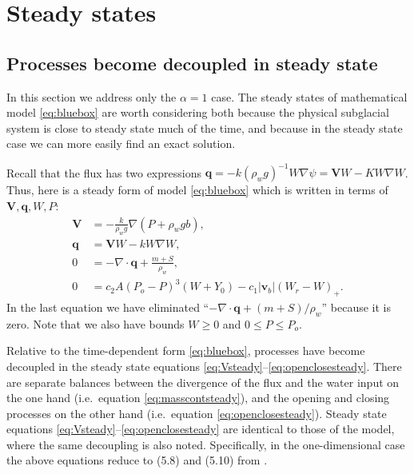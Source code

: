 \documentclass[11pt,final]{amsart}
\newcommand\bv{\mathbf{v}}
\newcommand\bV{\mathbf{V}}
\newcommand\bq{\mathbf{q}}
\newcommand{\Div}{\nabla\cdot}
\newcommand{\grad}{\nabla}
\begin{document}
\section{Steady states}  \label{sec:steadyverif}

\subsection*{Processes become decoupled in steady state}  In this section we address only the $\alpha=1$ case.  The steady states of mathematical model \eqref{eq:bluebox} are worth considering both because the physical subglacial system is close to steady state much of the time, and because in the steady state case we can more easily find an exact solution.

Recall that the flux has two expressions $\bq = - k (\rho_w g)^{-1} W \grad \psi = \bV W - K W \grad W$.  Thus, here is a steady form of model \eqref{eq:bluebox} which is written in terms of $\bV,\bq,W,P$:
\begin{align}
\bV &= - \frac{k}{\rho_w g} \grad \left(P + \rho_w g b\right), \label{eq:Vsteady} \\
\bq &= \bV W - k W \grad W, \label{eq:qsteady} \\
0 &= - \Div \bq + \frac{m+S}{\rho_w}, \label{eq:masscontsteady} \\
0 &= c_2 A (P_o - P)^3 (W+Y_0) - c_1 |\bv_b| (W_r - W)_+. \label{eq:openclosesteady}
\end{align}
In the last equation we have eliminated ``$- \Div \bq + (m+S)/\rho_w$'' because it is zero.  Note that we also have bounds $W\ge 0$ and $0 \le P \le P_o$.

Relative to the time-dependent form \eqref{eq:bluebox}, processes have become decoupled in the steady state equations \eqref{eq:Vsteady}--\eqref{eq:openclosesteady}.  There are separate balances between the divergence of the flux and the water input on the one hand (i.e.~equation \eqref{eq:masscontsteady}), and the opening and closing processes on the other hand (i.e.~equation \eqref{eq:openclosesteady}).  Steady state equations \eqref{eq:Vsteady}--\eqref{eq:openclosesteady} are identical to those of the \cite{Schoofetal2012} model, where the same decoupling is also noted.  Specifically, in the one-dimensional case the above equations reduce to (5.8) and (5.10) from \cite{Schoofetal2012}.
\end{document}
